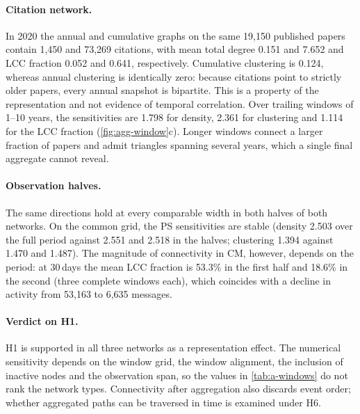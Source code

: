\paragraph{Citation network.}
In 2020 the annual and cumulative graphs on the same 19,150 published papers contain 1,450
and 73,269 citations, with mean total degree 0.151 and 7.652 and LCC fraction 0.052 and
0.641, respectively. Cumulative clustering is 0.124, whereas annual clustering is
identically zero: because citations point to strictly older papers, every annual snapshot
is bipartite. This is a property of the representation and not evidence of temporal
correlation. Over trailing windows of 1--10 years, the sensitivities are 1.798 for density,
2.361 for clustering and 1.114 for the LCC fraction (\cref{fig:agg-window}c). Longer
windows connect a larger fraction of papers and admit triangles spanning several years,
which a single final aggregate cannot reveal.

\paragraph{Observation halves.}
The same directions hold at every comparable width in both halves of both networks. On
the common grid, the PS sensitivities are stable (density 2.503 over the full period
against 2.551 and 2.518 in the halves; clustering 1.394 against 1.470 and 1.487). The
magnitude of connectivity in CM, however, depends on the period: at 30\,days the mean LCC
fraction is 53.3\% in the first half and 18.6\% in the second (three complete windows each),
which coincides with a decline in activity from 53,163 to 6,635 messages.

\paragraph{Verdict on H1.}
H1 is supported in all three networks as a representation effect. The numerical
sensitivity depends on the window grid, the window alignment, the inclusion of inactive
nodes and the observation span, so the values in \cref{tab:a-windows} do not rank the
network types. Connectivity after aggregation also discards event order; whether
aggregated paths can be traversed in time is examined under H6.
